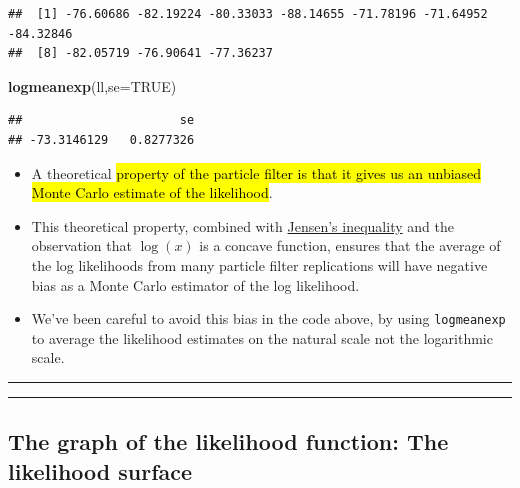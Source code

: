 \documentclass[]{article}
\newenvironment{Shaded}{\begin{snugshade}}{\end{snugshade}}
\newcommand{\KeywordTok}[1]{\textcolor[rgb]{0.13,0.29,0.53}{\textbf{#1}}}
\newcommand{\DataTypeTok}[1]{\textcolor[rgb]{0.13,0.29,0.53}{#1}}
\newcommand{\OtherTok}[1]{\textcolor[rgb]{0.56,0.35,0.01}{#1}}
\newcommand{\NormalTok}[1]{#1}
\begin{document}
\begin{verbatim}
##  [1] -76.60686 -82.19224 -80.33033 -88.14655 -71.78196 -71.64952 -84.32846
##  [8] -82.05719 -76.90641 -77.36237
\end{verbatim}

\begin{Shaded}
\begin{Highlighting}[]
\KeywordTok{logmeanexp}\NormalTok{(ll,}\DataTypeTok{se=}\OtherTok{TRUE}\NormalTok{)}
\end{Highlighting}
\end{Shaded}

\begin{verbatim}
##                      se 
## -73.3146129   0.8277326
\end{verbatim}


\begin{itemize}
\item
  A theoretical \hl{property of the particle filter is that it gives us an
  unbiased Monte Carlo estimate of the likelihood}.
\item
  This theoretical property, combined with
  \href{https://en.wikipedia.org/wiki/Jensen\%27s_inequality}{Jensen's
  inequality} and the observation that \(\log(x)\) is a concave
  function, ensures that the average of the log likelihoods from many
  particle filter replications will have negative bias as a Monte Carlo
  estimator of the log likelihood.
\item
  We've been careful to avoid this bias in the code above, by using
  \texttt{logmeanexp} to average the likelihood estimates on the natural
  scale not the logarithmic scale.
\end{itemize}

\begin{center}\rule{0.5\linewidth}{\linethickness}\end{center}

\begin{center}\rule{0.5\linewidth}{\linethickness}\end{center}

\subsection{The graph of the likelihood function: The likelihood
surface}\label{the-graph-of-the-likelihood-function-the-likelihood-surface}
\end{document}
